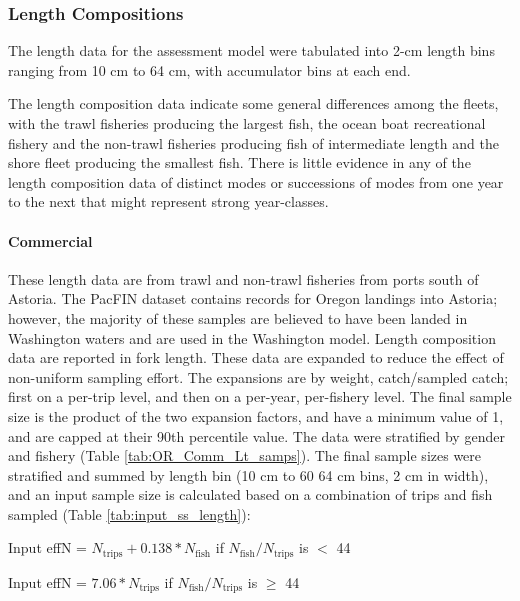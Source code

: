 \documentclass[11pt,
  english,
  letterpaper,
]{article}
\begin{document}
\hypertarget{length-compositions}{%
\subsubsection{Length Compositions}\label{length-compositions}}

The length data for the assessment model were tabulated into 2-cm length bins ranging from 10 cm to 64 cm, with accumulator bins at each end.

The length composition data indicate some general differences among the fleets, with the trawl fisheries producing the largest fish, the ocean boat recreational fishery and the non-trawl fisheries producing fish of intermediate length and the shore fleet producing the smallest fish. There is little evidence in any of the length composition data of distinct modes or successions of modes from one year to the next that might represent strong year-classes.

\hypertarget{commercial}{%
\paragraph{Commercial}\label{commercial}}

These length data are from trawl and non-trawl fisheries from ports south of Astoria. The PacFIN dataset contains records for Oregon landings into Astoria; however, the majority of these samples are believed to have been landed in Washington waters and are used in the Washington model. Length composition data are reported in fork length. These data are expanded to reduce the effect of non-uniform sampling effort. The expansions are by weight, catch/sampled catch; first on a per-trip level, and then on a per-year, per-fishery level. The final sample size is the product of the two expansion factors, and have a minimum value of 1, and are capped at their 90th percentile value. The data were stratified by gender and fishery (Table \ref{tab:OR_Comm_Lt_samps}). The final sample sizes were stratified and summed by length bin (10 cm to 60 64 cm bins, 2 cm in width), and an input sample size is calculated based on a combination of trips and fish sampled (Table \ref{tab:input_ss_length}):

\begin{centering}

Input effN = $N_{\text{trips}} + 0.138 * N_{\text{fish}}$ if $N_{\text{fish}}/N_{\text{trips}}$ is $<$ 44

Input effN = $7.06 * N_{\text{trips}}$ if $N_{\text{fish}}/N_{\text{trips}}$ is $\geq$ 44

\end{centering}
\end{document}
